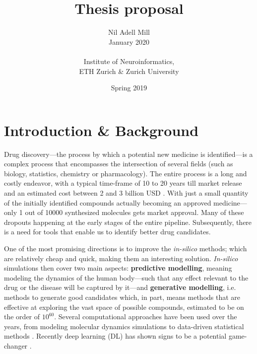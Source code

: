 \documentclass{article}
\begin{document}
\title{\Large Thesis proposal}
\author{Nil Adell Mill \\
        January 2020 \\ \\
        Institute of Neuroinformatics, \\
        ETH Zurich \& Zurich University}
\date{Spring 2019}

\maketitle

    \section*{Introduction \& Background}

Drug discovery---the process by which a potential new medicine is identified---is a
 complex process that encompasses the intersection of several fields (such as biology,
 statistics, chemistry or pharmacology). The entire process is a long and costly
 endeavor, with a typical time-frame of 10 to 20 years till market release and an
 estimated cost between 2 and 3 billion USD \cite{Schneider2019, Scannell2012}. With
 just a small quantity of the initially identified compounds actually becoming an
 approved medicine—only 1 out of 10000 synthesized molecules gets market approval. Many
 of these dropouts happening at the early stages of the entire pipeline.
 {\color{red}Subsequently}, there is a need for tools that enable us to identify better
 drug candidates.

One of the most promising directions is to improve the \emph{in-silico} methods; which
 are relatively cheap and quick, making them an interesting solution. \emph{In-silico}
 simulations then cover two main aspects: \textbf{predictive modelling}, meaning
 modeling the dynamics of the human body---such that any effect relevant to the drug or
 the disease will be captured by it---and \textbf{generative modelling}, i.e. methods to
 generate good candidates which, in part, means methods that are effective at exploring
 the vast space of possible compounds, estimated to be on the order of
 $10^{60}$\cite{Reymond2012}. Several computational approaches have been used over the
 years, from modeling molecular dynamics simulations to data-driven statistical methods
 \cite{Hung2014, Kuhn2016}. Recently deep learning (DL) has shown signs to be a
 potential game-changer \cite{Dargan2019}. 
 
\end{document}
